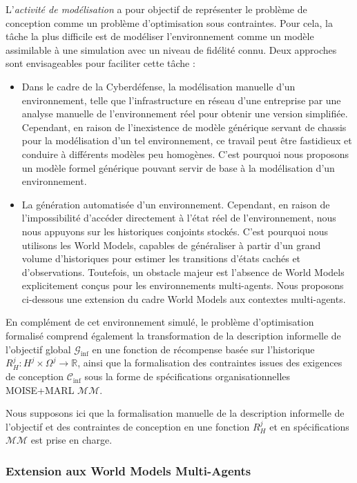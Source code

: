 \noindent L'\textit{activité de modélisation} a pour objectif de représenter le problème de conception comme un problème d'optimisation sous contraintes. Pour cela, la tâche la plus difficile est de modéliser l'environnement comme un modèle assimilable à une simulation avec un niveau de fidélité connu. Deux approches sont envisageables pour faciliter cette tâche :
\begin{itemize}
    \item Dans le cadre de la Cyberdéfense, la modélisation manuelle d'un environnement, telle que l'infrastructure en réseau d'une entreprise par une analyse manuelle de l'environnement réel pour obtenir une version simplifiée. Cependant, en raison de l'inexistence de modèle générique servant de chassis pour la modélisation d'un tel environnement, ce travail peut être fastidieux et conduire à différents modèles peu homogènes. C'est pourquoi nous proposons un modèle formel générique pouvant servir de base à la modélisation d'un environnement.
    \item La génération automatisée d'un environnement. Cependant, en raison de l'impossibilité d'accéder directement à l'état réel de l'environnement, nous nous appuyons sur les historiques conjoints stockés. C'est pourquoi nous utilisons les World Models, capables de généraliser à partir d'un grand volume d'historiques pour estimer les transitions d'états cachés et d'observations. Toutefois, un obstacle majeur est l'absence de World Models explicitement conçus pour les environnements multi-agents. Nous proposons ci-dessous une extension du cadre World Models aux contextes multi-agents.
\end{itemize}

En complément de cet environnement simulé, le problème d'optimisation formalisé comprend également la transformation de la description informelle de l'objectif global $\mathcal{G}_{\text{inf}}$ en une fonction de récompense basée sur l'historique $R^j_H: H^j \times \Omega^j \rightarrow \mathbb{R}$, ainsi que la formalisation des contraintes issues des exigences de conception $\mathcal{C}_{\text{inf}}$ sous la forme de spécifications organisationnelles MOISE+MARL $\mathcal{MM}$.

Nous supposons ici que la formalisation manuelle de la description informelle de l'objectif et des contraintes de conception en une fonction $R^j_H$ et en spécifications $\mathcal{MM}$ est prise en charge.



\subsubsection*{Extension aux World Models Multi-Agents}

